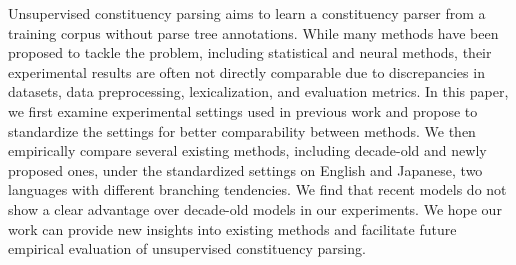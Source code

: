 Unsupervised constituency parsing aims to learn a constituency parser from a training corpus without parse tree annotations. While many methods have been proposed to tackle the problem, including statistical and neural methods, their experimental results are often not directly comparable due to discrepancies in datasets, data preprocessing, lexicalization, and evaluation metrics. In this paper, we first examine experimental settings used in previous work and propose to standardize the settings for better comparability between methods. We then empirically compare several existing methods, including decade-old and newly proposed ones, under the standardized settings on English and Japanese, two languages with different branching tendencies. We find that recent models do not show a clear advantage over decade-old models in our experiments. We hope our work can provide new insights into existing methods and facilitate future empirical evaluation of unsupervised constituency parsing.

